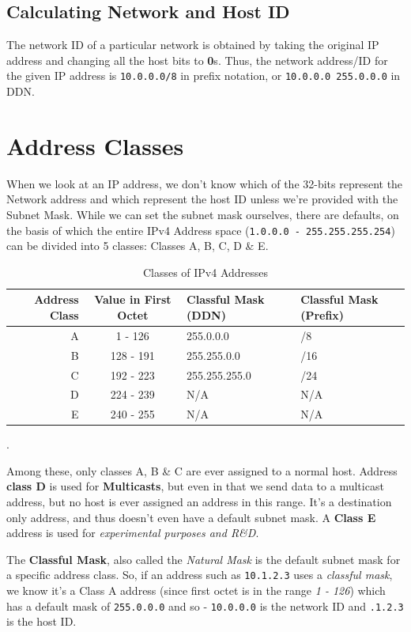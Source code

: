 \subsection{Calculating Network and Host ID}
The network ID of a particular network is obtained by taking the original IP address and changing all the host bits to \textbf{0}s. Thus, the network address/ID for the given IP address is \verb|10.0.0.0/8| in prefix notation, or \verb|10.0.0.0 255.0.0.0| in DDN. 

\section{Address Classes}
When we look at an IP address, we don't know which of the 32-bits represent the Network address and which represent the host ID unless we're provided with the Subnet Mask. While we can set the subnet mask ourselves, there are defaults, on the basis of which the entire IPv4 Address space (\verb|1.0.0.0 - 255.255.255.254|) can be divided into 5 classes: Classes A, B, C, D \& E. 

\begin{table}[H]
	\centering
	\begin{tabular}{rcll}
		\toprule
		\textbf{Address Class} &\textbf{Value in First Octet} &\textbf{Classful Mask (DDN)} &\textbf{Classful Mask (Prefix)}\\
		\midrule
		A &1 - 126 &255.0.0.0 &/8 \\
		B &128 - 191 &255.255.0.0 &/16 \\
		C &192 - 223 &255.255.255.0 &/24 \\
		D &224 - 239 &N/A &N/A \\
		E &240 - 255 &N/A &N/A \\
		\bottomrule
	\end{tabular}
	\vspace{-5pt}
	\caption{Classes of IPv4 Addresses}.
\end{table}
\vspace{-20pt}

\noindent
Among these, only classes A, B \& C are ever assigned to a normal host. Address \textbf{class D} is used for \textbf{Multicasts}, but even in that we send data to a multicast address, but no host is ever assigned an address in this range. It's a destination only address, and thus doesn't even have a default subnet mask. A \textbf{Class E} address is used for \textit{experimental purposes and R\&D}. 

The \textbf{Classful Mask}, also called the \textit{Natural Mask} is the default subnet mask for a specific address class. So, if an address such as \verb|10.1.2.3| uses a \textit{classful mask}, we know it's a Class A address (since first octet is in the range \textit{1 - 126}) which has a default mask of \verb|255.0.0.0| and so - \verb|10.0.0.0| is the network ID and \verb|.1.2.3| is the host ID.

